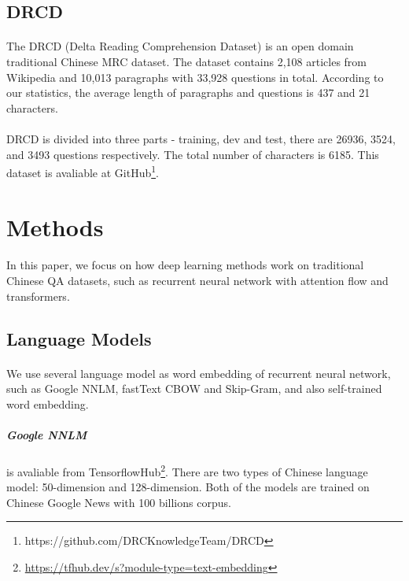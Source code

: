 \documentclass{article}
\begin{document}
\subsection{DRCD}
\paragraph{}
The DRCD\cite{shao2018drcd} (Delta Reading Comprehension Dataset) is an open domain traditional Chinese MRC dataset. The dataset contains 2,108 articles from Wikipedia and 10,013 paragraphs with 33,928 questions in total. According to our statistics, the average length of paragraphs and questions is 437 and 21 characters.

\paragraph{}
DRCD is divided into three parts - training, dev and test, there are 26936, 3524, and 3493 questions respectively. The total number of characters is 6185. This dataset is avaliable at GitHub\footnote{\label{drcd_github}https://github.com/DRCKnowledgeTeam/DRCD}.

\section{Methods}
\paragraph{}
In this paper, we focus on how deep learning methods work on traditional Chinese QA datasets, such as recurrent neural network with attention flow and transformers.

\subsection{Language Models}
\paragraph{}
We use several language model as word embedding of recurrent neural network, such as Google NNLM, fastText\cite{bojanowski2017enriching} CBOW and Skip-Gram, and also self-trained word embedding.

\subparagraph{Google NNLM} is avaliable from TensorflowHub\footnote{\url{https://tfhub.dev/s?module-type=text-embedding}}. There are two types of Chinese language model: 50-dimension and 128-dimension. Both of the models are trained on Chinese Google News with 100 billions corpus.
\end{document}
